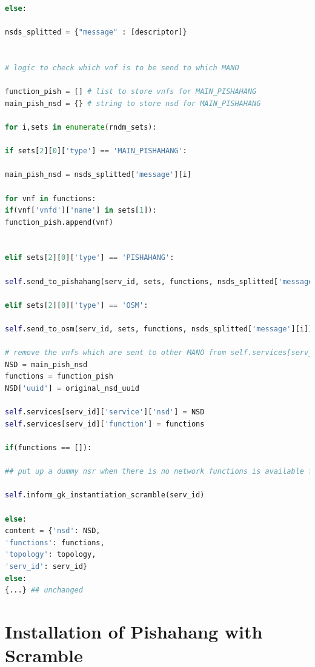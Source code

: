 \begin{lstlisting}[language=Python,caption=Extended \textbf{SLM\_mapping\_scramble} function, label=lis:SLM_scramble]
else:

nsds_splitted = {"message" : [descriptor]}


# logic to check which vnf is to be send to which MANO

function_pish = [] # list to store vnfs for MAIN_PISHAHANG
main_pish_nsd = {} # string to store nsd for MAIN_PISHAHANG

for i,sets in enumerate(rndm_sets):

if sets[2][0]['type'] == 'MAIN_PISHAHANG':

main_pish_nsd = nsds_splitted['message'][i]

for vnf in functions:
if(vnf['vnfd']['name'] in sets[1]):
function_pish.append(vnf)


elif sets[2][0]['type'] == 'PISHAHANG':

self.send_to_pishahang(serv_id, sets, functions, nsds_splitted['message'][i])

elif sets[2][0]['type'] == 'OSM':

self.send_to_osm(serv_id, sets, functions, nsds_splitted['message'][i])             

# remove the vnfs which are sent to other MANO from self.services[serv_id]['function']
NSD = main_pish_nsd
functions = function_pish
NSD['uuid'] = original_nsd_uuid

self.services[serv_id]['service']['nsd'] = NSD
self.services[serv_id]['function'] = functions

if(functions == []):

## put up a dummy nsr when there is no network functions is available for this mano. So as to keep the unique UUID of this instantiation request in ledger instead of forced rollback.

self.inform_gk_instantiation_scramble(serv_id)

else:
content = {'nsd': NSD,
'functions': functions,
'topology': topology,
'serv_id': serv_id} 
else:
{...} ## unchanged
\end{lstlisting}

\section{Installation of Pishahang with Scramble}

